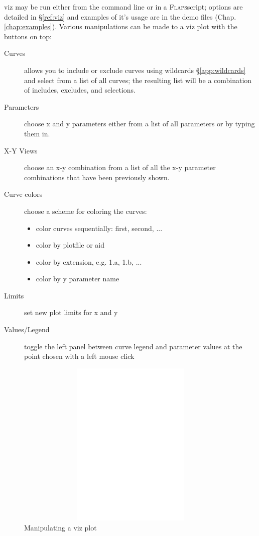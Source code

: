 \documentclass[11pt,openany,twoside]{book}
\numberwithin{equation}{section}		%
\newcommand{\Cmd}[1]{{\sf #1}}
\newcommand{\Flaps}{\textsc{Flaps\:}}
\newcommand{\Sectref}[1]{\S\ref{#1}}
\newcommand{\Chapref}[1]{Chap. \ref{#1}}
\begin{document}
\Cmd{viz} may be run either from the command line or in a \Flaps script;
options are detailed in \Sectref{ref:viz} and
examples of it's usage are in the demo files (\Chapref{chap:examples}).
Various manipulations can be made to a \Cmd{viz} plot with the buttons on top:
\begin{description}
	\item[Curves] allows you to include or exclude curves using wildcards
		\Sectref{app:wildcards}
		and select from a list of all curves; the resulting list will be a
		combination of includes, excludes, and selections.
	\item[Parameters] choose x and y parameters either from a list of all
		parameters or by typing them in.
	\item[X-Y Views] choose an x-y combination from a list of all the x-y parameter
		combinations that have been previously shown.
	\item[Curve colors] choose a scheme for coloring the curves:
		\begin{itemize}
			\item color curves sequentially: first, second, ...
			\item color by plotfile or aid
			\item color by extension, e.g. 1.a, 1.b, ...
			\item color by y parameter name
		\end{itemize}
	\item[Limits] set new plot limits for x and y
	\item[Values/Legend] toggle the left panel between curve legend and parameter values
		at the point chosen with a left mouse click
\end{description}
\begin{figure}[ht] 	%
		\includegraphics[height=8cm,width=15cm]{viz-manip.eps}
	\centering
	\caption{Manipulating a \Cmd{viz} plot}\label{fig:viz-manip}
\end{figure}
\end{document}
